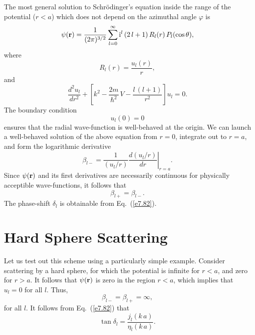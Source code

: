 The most general solution to Schr\"{o}dinger's equation inside 
the range of the potential ($r<a$) which does not depend on the
azimuthal angle $\varphi$ is
\begin{equation}
\psi({\bf r}) = \frac{1}{(2\pi)^{3/2}}\sum_{l=0}^\infty
{\rm i}^l \,(2\,l+1)\,R_l(r)\,P_l(\cos\theta),
\end{equation}
where
\begin{equation}
R_l (r) = \frac{u_l(r)}{r},
\end{equation}
and
\begin{equation}\label{e7.85}
\frac{d^2 u_l}{d r^2} +\left[k^2 - \frac{2m}{\hbar^2} \,V - \frac{l\,(l+1)}
{r^2}\right] u_l = 0.
\end{equation}
The boundary condition 
\begin{equation}\label{e7.86}
u_l(0) = 0
\end{equation}
 ensures that the radial wave-function is well-behaved at the
origin. 
We can launch a well-behaved solution of the above equation from 
$r=0$, integrate out to $r=a$, and form the logarithmic derivative
\begin{equation}
\beta_{l-} = \left.\frac{1}{(u_l/r)} \frac{d(u_l/r)}{dr}\right|_{r=a}.
\end{equation}
Since $\psi({\bf r})$ and its first derivatives are necessarily continuous for
physically acceptible wave-functions, it follows that
\begin{equation}
\beta_{l+} = \beta_{l-}.
\end{equation}
The phase-shift $\delta_l$ is obtainable from Eq.~(\ref{e7.82}).

\section{Hard Sphere Scattering}
Let us test out this scheme using a particularly simple example. Consider
scattering by a hard sphere, for which  the potential is infinite 
for $r<a$, and zero for $r>a$. It follows that $\psi({\bf r})$ is
zero in the region $r<a$, which implies that  $u_l =0$ for all $l$. 
Thus,
\begin{equation}
\beta_{l-} = \beta_{l+} = \infty,
\end{equation}
for all $l$. It follows from Eq.~(\ref{e7.82}) that
\begin{equation}\label{e7.90}
\tan \delta_l = \frac{j_l(k\,a)}{\eta_l(k\,a)}.
\end{equation}

